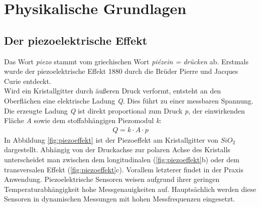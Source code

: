 \section{Physikalische Grundlagen}
\subsection{Der piezoelektrische Effekt}
Das Wort \textit{\glqq piezo\grqq{}} stammt vom griechischen Wort \textit{\glqq pi\'{e}zein = drücken\grqq{}} ab. Erstmals wurde der piezoelektrische Effekt 1880 durch die Brüder Pierre und Jacques Curie entdeckt.\autocites[vgl.][]{duden01}[vgl.][]{Curie}\\
Wird ein Kristallgitter durch äußeren Druck verformt, entsteht an den Oberflächen eine elektrische Ladung \textit{Q}. Dies führt zu einer messbaren Spannung. Die erzeugte Ladung \textit{Q} ist direkt proportional  zum Druck \textit{p}, der einwirkenden Fläche \textit{A} sowie dem stoffabhängigen Piezomodul \textit{k}:
\begin{eqnarray}
    Q=k \cdot A \cdot p
\end{eqnarray}
In Abbildung \ref{fig:piezoeffekt} ist der Piezoeffekt am Kristallgitter von $SiO_2$ dargestellt. Abhängig von der Druckachse zur polaren Achse des Kristalls unterscheidet man zwischen dem longitudinalen (\ref{fig:piezoeffekt}b) oder dem transversalen Effekt (\ref{fig:piezoeffekt}c). Vorallem letzterer findet in der Praxis Anwendung. Piezoelektrische Sensoren weisen aufgrund ihrer geringen Temperaturabhängigkeit hohe Messgenauigkeiten auf. Hauptsächlich werden diese Sensoren in dynamischen Messungen mit hohen Messfrequenzen eingesetzt. \autocites[vgl.][260 \psqq]{Sensoren}[vgl.][273 \psq]{Physik}

